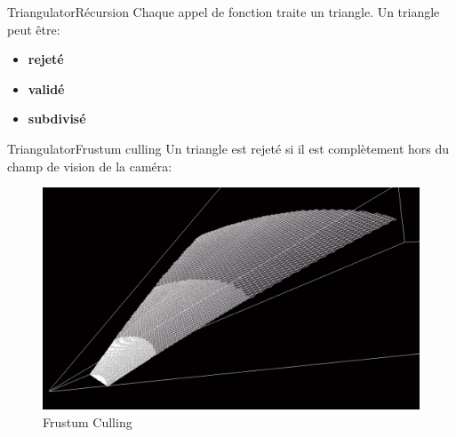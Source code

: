 \documentclass[french]{beamer}
\begin{document}
\begin{frame}{Triangulator}{Récursion}
Chaque appel de fonction traite un triangle. Un triangle peut être:
\newline
  \begin{itemize}
  \item {
    \textbf{rejeté}
  }
  \item {
    \textbf{validé}
  }
  \item {
    \textbf{subdivisé}
  }
  \end{itemize}
\end{frame}

\begin{frame}{Triangulator}{Frustum culling}
Un triangle est rejeté si il est complètement hors du champ de vision de la caméra: 
\begin{figure}[H]
  \centerline{
  \includegraphics[scale=0.18]{img/culling.png}
  }
  \caption{Frustum Culling \protect\footnotemark}
  \end{figure}
  
  \end{frame}
  
\end{document}
